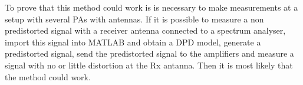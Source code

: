 To prove that this method could work is is necessary to make measurements at a setup with several PAs with antennas. If it is possible to measure a non predistorted signal with a receiver antenna connected to a spectrum analyser, import this signal into MATLAB and obtain a DPD model, generate a predistorted signal, send the predistorted signal to the amplifiers and measure a signal with no or little distortion at the Rx antanna. Then it is most likely that the method could work.    























